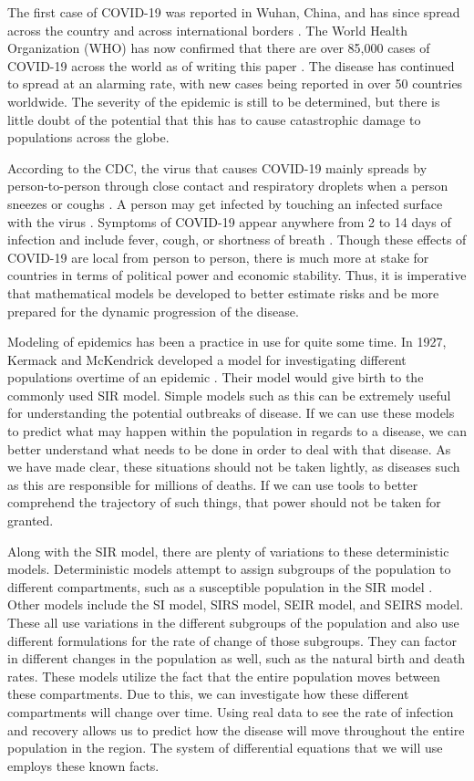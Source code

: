 \documentclass[12pt, a4paper]{article}
\begin{document}
The first case of COVID-19 was reported in Wuhan, China, and has since spread across the country and across international borders \cite{center}. The World Health Organization (WHO) has now confirmed that there are over 85,000 cases of COVID-19 across the world as of writing this paper \cite{center}. The disease has continued to spread at an alarming rate, with new cases being reported in over 50 countries worldwide. The severity of the epidemic is still to be determined, but there is little doubt of the potential that this has to cause catastrophic damage to populations across the globe. 

According to the CDC, the virus that causes COVID-19 mainly spreads by person-to-person through close contact and respiratory droplets when a person sneezes or coughs \cite{center}. A person may get infected by touching an infected surface with the virus \cite{center}. Symptoms of COVID-19 appear anywhere from 2 to 14 days of infection and include fever, cough, or shortness of breath \cite{center}. Though these effects of COVID-19 are local from person to person, there is much more at stake for countries in terms of political power and economic stability. Thus, it is imperative that mathematical models be developed to better estimate risks and be more prepared for the dynamic progression of the disease.

Modeling of epidemics has been a practice in use for quite some time. In 1927, Kermack and McKendrick developed a model for investigating different populations overtime of an epidemic \cite{kermack}. Their model would give birth to the commonly used SIR model. Simple models such as this can be extremely useful for understanding the potential outbreaks of disease. If we can use these models to predict what may happen within the population in regards to a disease, we can better understand what needs to be done in order to deal with that disease. As we have made clear, these situations should not be taken lightly, as diseases such as this are responsible for millions of deaths. If we can use tools to better comprehend the trajectory of such things, that power should not be taken for granted.

Along with the SIR model, there are plenty of variations to these deterministic models. Deterministic models attempt to assign subgroups of the population to different compartments, such as a susceptible population in the SIR model \cite{sir}. Other models include the SI model, SIRS model, SEIR model, and SEIRS model. These all use variations in the different subgroups of the population and also use different formulations for the rate of change of those subgroups. They can factor in different changes in the population as well, such as the natural birth and death rates. These models utilize the fact that the entire population moves between these compartments. Due to this, we can investigate how these different compartments will change over time. Using real data to see the rate of infection and recovery allows us to predict how the disease will move throughout the entire population in the region. The system of differential equations that we will use employs these known facts.
\end{document}
